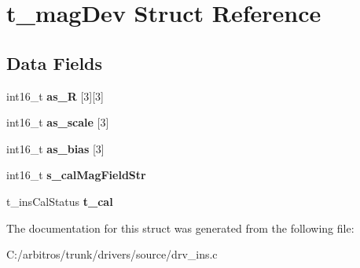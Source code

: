 \hypertarget{structt__mag_dev}{\section{t\-\_\-mag\-Dev Struct Reference}
\label{structt__mag_dev}
}
\subsection*{Data Fields}
\begin{DoxyCompactItemize}
\item 
\hypertarget{structt__mag_dev_ad7daca491dc2ace488c7fd26eee4c5e9}{int16\-\_\-t {\bfseries as\-\_\-\-R} \mbox{[}3\mbox{]}\mbox{[}3\mbox{]}}\label{structt__mag_dev_ad7daca491dc2ace488c7fd26eee4c5e9}

\item 
\hypertarget{structt__mag_dev_a090c73eef857227542434acce66453fd}{int16\-\_\-t {\bfseries as\-\_\-scale} \mbox{[}3\mbox{]}}\label{structt__mag_dev_a090c73eef857227542434acce66453fd}

\item 
\hypertarget{structt__mag_dev_ab09e9163fcbdd1f8df41f93844da2d68}{int16\-\_\-t {\bfseries as\-\_\-bias} \mbox{[}3\mbox{]}}\label{structt__mag_dev_ab09e9163fcbdd1f8df41f93844da2d68}

\item 
\hypertarget{structt__mag_dev_a941494cae86b6eac83016789e64284bc}{int16\-\_\-t {\bfseries s\-\_\-cal\-Mag\-Field\-Str}}\label{structt__mag_dev_a941494cae86b6eac83016789e64284bc}

\item 
\hypertarget{structt__mag_dev_a5b8c77544b001e373f59189f0fbe6878}{t\-\_\-ins\-Cal\-Status {\bfseries t\-\_\-cal}}\label{structt__mag_dev_a5b8c77544b001e373f59189f0fbe6878}

\end{DoxyCompactItemize}


The documentation for this struct was generated from the following file\-:\begin{DoxyCompactItemize}
\item 
C\-:/arbitros/trunk/drivers/source/drv\-\_\-ins.\-c\end{DoxyCompactItemize}
